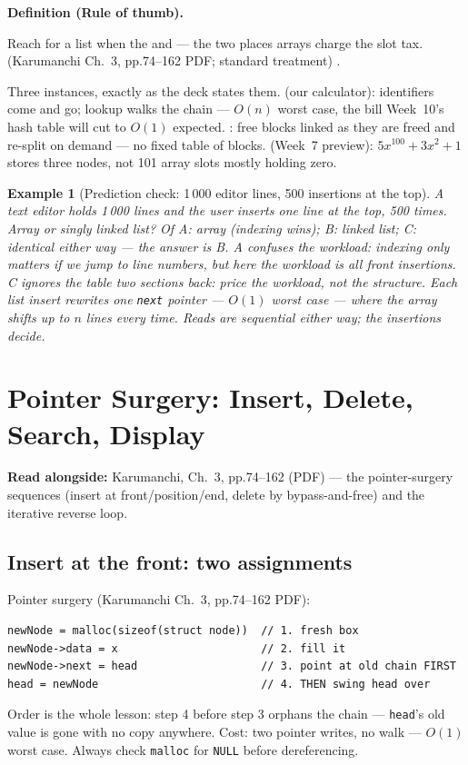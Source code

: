 \documentclass[11pt]{article}
\newtheorem{example}{Example}[section]
\newenvironment{definitionbox}[1]{%
  \par\noindent\textbf{Definition (#1).}\ \itshape
}{\par\vspace{0.3em}}
\begin{document}
\begin{definitionbox}{Rule of thumb}
Reach for a list when the  and  --- the two places arrays charge the slot tax. (Karumanchi Ch.~3, pp.74--162 PDF; standard treatment) \cite{Karumanchi2017_data_structures_algorithms_made_easy}.
\end{definitionbox}

Three instances, exactly as the deck states them.  (our calculator): identifiers come and go; lookup walks the chain --- $O(n)$ worst case, the bill Week~10's hash table will cut to $O(1)$ expected. : free blocks linked as they are freed and re-split on demand --- no fixed table of blocks.  (Week~7 preview): $5x^{100} + 3x^{2} + 1$ stores three nodes, not 101 array slots mostly holding zero.

\begin{example}[Prediction check: 1\,000 editor lines, 500 insertions at the top]
A text editor holds 1\,000 lines and the user inserts one line at the top, 500 times. Array or singly linked list? Of A: array (indexing wins); B: linked list; C: identical either way --- the answer is B. A confuses the workload: indexing only matters if we jump to line numbers, but here the workload is all front insertions. C ignores the table two sections back: price the workload, not the structure. Each list insert rewrites one \texttt{next} pointer --- $O(1)$ worst case --- where the array shifts up to $n$ lines every time. Reads are sequential either way; the insertions decide.
\end{example}

\section{Pointer Surgery: Insert, Delete, Search, Display}

\textbf{Read alongside:} Karumanchi, Ch.~3, pp.74--162 (PDF) --- the pointer-surgery sequences (insert at front/position/end, delete by bypass-and-free) and the iterative reverse loop.

\subsection{Insert at the front: two assignments}

Pointer surgery (Karumanchi Ch.~3, pp.74--162 PDF):
{\footnotesize
\begin{verbatim}
newNode = malloc(sizeof(struct node))  // 1. fresh box
newNode->data = x                      // 2. fill it
newNode->next = head                   // 3. point at old chain FIRST
head = newNode                         // 4. THEN swing head over
\end{verbatim}
}
Order is the whole lesson: step 4 before step 3 orphans the chain --- \texttt{head}'s old value is gone with no copy anywhere. Cost: two pointer writes, no walk --- $O(1)$ worst case. Always check \texttt{malloc} for \texttt{NULL} before dereferencing.
\end{document}
